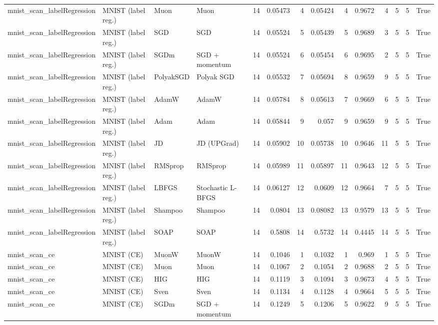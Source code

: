 \begin{tabular}{llllrrrrrrrrrr}
mnist\_scan\_labelRegression & MNIST (label reg.) & Muon & Muon & 14 & 0.05473 & 4 & 0.05424 & 4 & 0.9672 & 4 & 5 & 5 & True \\
mnist\_scan\_labelRegression & MNIST (label reg.) & SGD & SGD & 14 & 0.05524 & 5 & 0.05439 & 5 & 0.9689 & 3 & 5 & 5 & True \\
mnist\_scan\_labelRegression & MNIST (label reg.) & SGDm & SGD + momentum & 14 & 0.05524 & 6 & 0.05454 & 6 & 0.9695 & 2 & 5 & 5 & True \\
mnist\_scan\_labelRegression & MNIST (label reg.) & PolyakSGD & Polyak SGD & 14 & 0.05532 & 7 & 0.05694 & 8 & 0.9659 & 9 & 5 & 5 & True \\
mnist\_scan\_labelRegression & MNIST (label reg.) & AdamW & AdamW & 14 & 0.05784 & 8 & 0.05613 & 7 & 0.9669 & 6 & 5 & 5 & True \\
mnist\_scan\_labelRegression & MNIST (label reg.) & Adam & Adam & 14 & 0.05844 & 9 & 0.057 & 9 & 0.9659 & 9 & 5 & 5 & True \\
mnist\_scan\_labelRegression & MNIST (label reg.) & JD & JD (UPGrad) & 14 & 0.05902 & 10 & 0.05738 & 10 & 0.9646 & 11 & 5 & 5 & True \\
mnist\_scan\_labelRegression & MNIST (label reg.) & RMSprop & RMSprop & 14 & 0.05989 & 11 & 0.05897 & 11 & 0.9643 & 12 & 5 & 5 & True \\
mnist\_scan\_labelRegression & MNIST (label reg.) & LBFGS & Stochastic L-BFGS & 14 & 0.06127 & 12 & 0.0609 & 12 & 0.9664 & 7 & 5 & 5 & True \\
mnist\_scan\_labelRegression & MNIST (label reg.) & Shampoo & Shampoo & 14 & 0.0804 & 13 & 0.08082 & 13 & 0.9579 & 13 & 5 & 5 & True \\
mnist\_scan\_labelRegression & MNIST (label reg.) & SOAP & SOAP & 14 & 0.5808 & 14 & 0.5732 & 14 & 0.4445 & 14 & 5 & 5 & True \\
mnist\_scan\_ce & MNIST (CE) & MuonW & MuonW & 14 & 0.1046 & 1 & 0.1032 & 1 & 0.969 & 1 & 5 & 5 & True \\
mnist\_scan\_ce & MNIST (CE) & Muon & Muon & 14 & 0.1067 & 2 & 0.1054 & 2 & 0.9688 & 2 & 5 & 5 & True \\
mnist\_scan\_ce & MNIST (CE) & HIG & HIG & 14 & 0.1119 & 3 & 0.1094 & 3 & 0.9673 & 4 & 5 & 5 & True \\
mnist\_scan\_ce & MNIST (CE) & Sven & Sven & 14 & 0.1134 & 4 & 0.1128 & 4 & 0.9664 & 5 & 5 & 5 & True \\
mnist\_scan\_ce & MNIST (CE) & SGDm & SGD + momentum & 14 & 0.1249 & 5 & 0.1206 & 5 & 0.9622 & 9 & 5 & 5 & True \\

\end{tabular}
